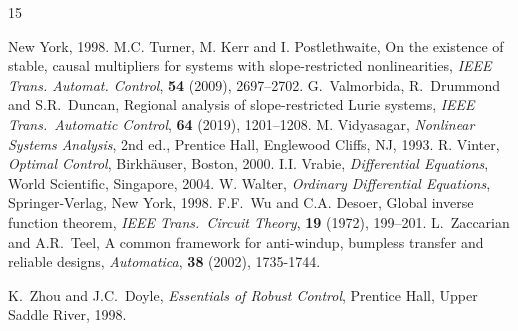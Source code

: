 \documentclass[a4paper,11pt]{article}
\numberwithin{equation}{section}
\numberwithin{figure}{section}
\numberwithin{table}{section}
\begin{document}
\begin{thebibliography}{15}
\begin{small}
New York, 1998.
%
\vspace{-2mm}
M.C. Turner, M. Kerr and I. Postlethwaite, On the existence of stable, causal multipliers for systems with slope-restricted nonlinearities, {\it IEEE Trans. Automat. Control}, {\bf 54}
(2009), 2697--2702.
%
\vspace{-2mm}
G.\ Valmorbida, R.\ Drummond and S.R.\ Duncan, Regional analysis of slope-restricted Lurie systems, {\it IEEE Trans.\ Automatic Control}, {\bf 64} (2019), 1201--1208.
%
\vspace{-2mm}
M. Vidyasagar, {\it Nonlinear Systems Analysis}, 2nd ed., Prentice Hall, Englewood Cliffs, NJ, 1993.
%
\vspace{-2mm}
R. Vinter, {\it Optimal Control}, Birkh{\"a}user, Boston, 2000.
%
\vspace{-2mm}
 I.I. Vrabie, {\it Differential Equations}, World Scientific, Singapore, 2004.
%
\vspace{-2mm}
 W. Walter, {\it Ordinary Differential Equations}, Springer-Verlag,
New York, 1998.
%
\vspace{-2mm}
 F.F.\ Wu and C.A. Desoer, Global inverse function theorem, {\it IEEE Trans.\ Circuit Theory}, {\bf 19} (1972), 199--201.
%
\vspace{-3mm}
 L.\ Zaccarian and A.R.\ Teel, A common framework for anti-windup, bumpless transfer
and reliable designs, {\it Automatica}, {\bf 38} (2002), 1735-1744.

\vspace{-3mm}
 K.\ Zhou and J.C.\ Doyle, {\em Essentials of {R}obust {C}ontrol}, Prentice Hall, Upper Saddle River, 1998.
\end{small}
\end{thebibliography}
\end{document}
